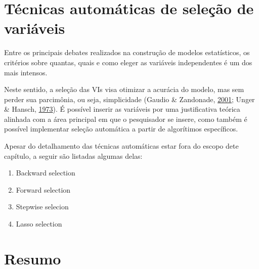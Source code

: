 \documentclass[
]{book}
\providecommand{\tightlist}{%
  \setlength{\itemsep}{0pt}\setlength{\parskip}{0pt}}
\begin{document}
\hypertarget{tuxe9cnicas-automuxe1ticas-de-seleuxe7uxe3o-de-variuxe1veis}{%
\section{Técnicas automáticas de seleção de
variáveis}\label{tuxe9cnicas-automuxe1ticas-de-seleuxe7uxe3o-de-variuxe1veis}}

Entre os principais debates realizados na construção de modelos
estatísticos, os critérios sobre quantas, quais e como eleger as
variáveis independentes é um dos mais intensos.

Neste sentido, a seleção das VIs visa otimizar a acurácia do modelo, mas
sem perder sua parcimônia, ou seja, simplicidade (Gaudio \& Zandonade,
\protect\hyperlink{ref-Gaudio2001}{2001}; Unger \& Hansch,
\protect\hyperlink{ref-Unger1973}{1973}). É possível inserir as
variáveis por uma justificativa teórica alinhada com a área principal em
que o pesquisador se insere, como também é possível implementar seleção
automática a partir de algorítimos específicos.

Apesar do detalhamento das técnicas automáticas estar fora do escopo
dete capítulo, a seguir são listadas algumas delas:

\begin{enumerate}
\def\labelenumi{\arabic{enumi}.}
\tightlist
\item
  Backward selection\\
\item
  Forward selection\\
\item
  Stepwise selecion\\
\item
  Lasso selection
\end{enumerate}

\hypertarget{resumo-13}{%
\section{Resumo}\label{resumo-13}}
\end{document}
